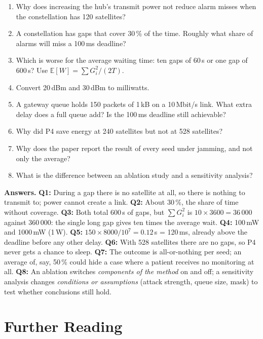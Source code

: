 \documentclass[11pt,a4paper]{article}
\begin{document}
\begin{enumerate}[label=\textbf{Q\arabic*.}]
\item Why does increasing the hub's transmit power not reduce alarm misses when the constellation has 120 satellites?
\item A constellation has gaps that cover 30\,\% of the time. Roughly what share of alarms will miss a 100\,ms deadline?
\item Which is worse for the average waiting time: ten gaps of 60\,s or one gap of 600\,s? Use $\mathbb{E}[W]=\sum G_i^2/(2T)$.
\item Convert 20\,dBm and 30\,dBm to milliwatts.
\item A gateway queue holds 150 packets of 1\,kB on a 10\,Mbit/s link. What extra delay does a full queue add? Is the 100\,ms deadline still achievable?
\item Why did P4 save energy at 240 satellites but not at 528 satellites?
\item Why does the paper report the result of every seed under jamming, and not only the average?
\item What is the difference between an ablation study and a sensitivity analysis?
\end{enumerate}

\textsf{\textbf{Answers.}}\small
\textbf{Q1:} During a gap there is no satellite at all, so there is nothing to transmit to; power cannot create a link.
\textbf{Q2:} About 30\,\%, the share of time without coverage.
\textbf{Q3:} Both total 600\,s of gaps, but $\sum G_i^2$ is $10\times3600 = 36\,000$ against $360\,000$: the single long gap gives ten times the average wait.
\textbf{Q4:} 100\,mW and 1000\,mW (1\,W).
\textbf{Q5:} $150\times8000/10^7 = 0.12$\,s = 120\,ms, already above the deadline before any other delay.
\textbf{Q6:} With 528 satellites there are no gaps, so P4 never gets a chance to sleep.
\textbf{Q7:} The outcome is all-or-nothing per seed; an average of, say, 50\,\% could hide a case where a patient receives no monitoring at all.
\textbf{Q8:} An ablation switches \emph{components of the method} on and off; a sensitivity analysis changes \emph{conditions or assumptions} (attack strength, queue size, mask) to test whether conclusions still hold.
\normalsize

\section{Further Reading}
\end{document}
